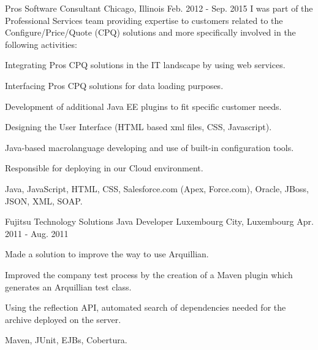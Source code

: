 \begin{cventries}
  \experienceentry
  	{Pros} %
    {Software Consultant} %
    {Chicago, Illinois} %
    {Feb. 2012 - Sep. 2015} %
    {I was part of the Professional Services team providing expertise to customers related to the
Configure/Price/Quote (CPQ) solutions and more specifically involved in the following activities:}
    {
      \begin{cvitems} %
        	\item Integrating Pros CPQ solutions in the IT landscape by using web services.
			\item Interfacing Pros CPQ solutions for data loading purposes.
			\item Development of additional Java EE plugins to fit specific customer needs.
    		\item Designing the User Interface (HTML based xml files, CSS, Javascript).
    		\item Java-based macrolanguage developing and use of built-in configuration tools.
    		\item Responsible for deploying in our Cloud environment.
      \end{cvitems}
    }
    {Java, JavaScript, HTML, CSS, Salesforce.com (Apex, Force.com), Oracle, JBoss, JSON, XML, SOAP.}
  
  \experienceentry
  	{Fujitsu Technology Solutions} %
    {Java Developer} %
    {Luxembourg City, Luxembourg} %
    {Apr. 2011 - Aug. 2011} %
    {} %
    {
    	\begin{cvitems} %
        	\item Made a solution to improve the way to use Arquillian.
			\item Improved the company test process by the creation of a Maven plugin which generates an Arquillian test class.
			\item Using the reflection API, automated search of dependencies needed for the archive deployed on the server.
      	\end{cvitems}
    }
    {Maven, JUnit, EJBs, Cobertura.}

\end{cventries}
